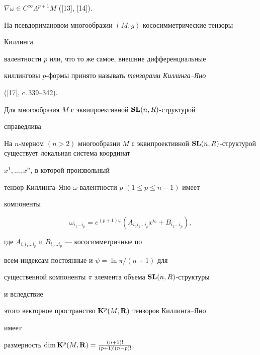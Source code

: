 $\nabla\omega\in C^\infty\Lambda^{p+1}M$ ([13], [14]). 


 


На псевдоримановом многообразии $(M,g)$ кососимметрические тензоры 


Киллинга 


валентности $p$ или, что то же самое, внешние дифференциальные 


киллинговы $p$-формы принято называть {\it тензорами Киллинга--Яно} 


([17], c.\,339--342). 


 


Для многообразия $M$ с эквипроективной $\bold {SL}(n,R)$-структурой 


справедлива 


 


\begin{thm} 


На $n$-мерном $(n>2)$ многообразии $M$ с эквипроективной $\bold 


{SL}(n,R)$-структурой существует локальная система координат 


$x^1,\dotsc,x^n$, в которой произвольный 


тензор Кил\-лин\-га--Яно $\omega$ валентности $p$ $(1\le p\le n-1)$ имеет 


компоненты 


\begin{equation} 


\omega_{i_1\dotsc i_p}=e^{(p+1)\psi}(A_{i_0i_1\dotsc i_p}x^{i_0} 


+B_{i_1\dotsc i_p}), 


\end{equation} 


где $A_{i_0i_1\dotsc i_p}$ и $B_{i_1\dotsc i_p}$ --- кососимметричные по 


всем индексам постоянные и $\psi=\ln\pi/(n+1)$ для 


существенной компоненты $\pi$ элемента объема $\bold {SL}(n,R)$-структуры 


и вследствие 


этого векторное пространство $\bold K^p(M,\bold R)$ тензоров Киллинга--Яно 


имеет 


размерность $\dim\bold K^p(M,\bold R)= \frac{(n+1)!}{(p+1)!(n-p)!}$. 


\end{thm} 


